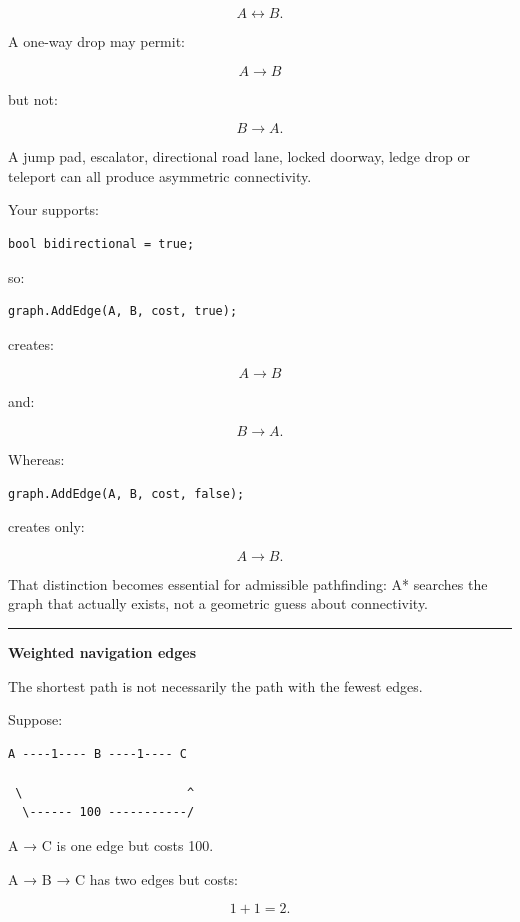\[
A\leftrightarrow B.
\]

A one-way drop may permit:

\[
A\rightarrow B
\]

but not:

\[
B\rightarrow A.
\]

A jump pad, escalator, directional road lane, locked doorway, ledge drop or teleport can all produce asymmetric connectivity.

Your  supports:

\begin{verbatim}
bool bidirectional = true;
\end{verbatim}

so:

\begin{verbatim}
graph.AddEdge(A, B, cost, true);
\end{verbatim}

creates:

\[
A\rightarrow B
\]

and:

\[
B\rightarrow A.
\]

Whereas:

\begin{verbatim}
graph.AddEdge(A, B, cost, false);
\end{verbatim}

creates only:

\[
A\rightarrow B.
\]

That distinction becomes essential for admissible pathfinding: A* searches the graph that actually exists, not a geometric guess about connectivity.

\begin{center}\rule{0.5\linewidth}{0.5pt}\end{center}

\textbf{Weighted navigation edges}

The shortest path is not necessarily the path with the fewest edges.

Suppose:

\begin{verbatim}
A ----1---- B ----1---- C

 \                       ^
  \------ 100 -----------/
\end{verbatim}

A → C is one edge but costs 100.

A → B → C has two edges but costs:

\[
1+1=2.
\]

